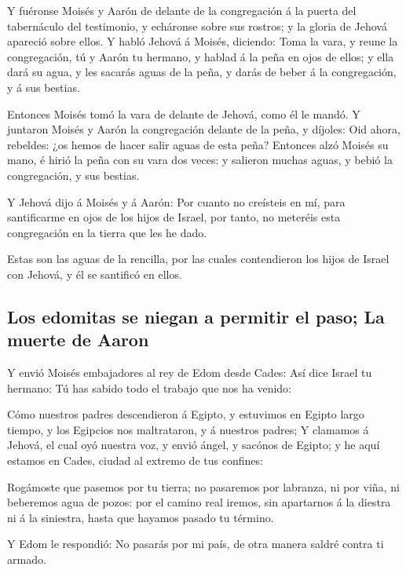  Y fuéronse Moisés y Aarón de delante de la congregación á
la puerta del tabernáculo del testimonio, y echáronse sobre sus rostros;
y la gloria de Jehová apareció sobre ellos.  Y habló Jehová
á Moisés, diciendo:  Toma la vara, y reune la congregación,
tú y Aarón tu hermano, y hablad á la peña en ojos de ellos; y ella dará
su agua, y les sacarás aguas de la peña, y darás de beber á la
congregación, y á sus bestias.

 Entonces Moisés tomó la vara de delante de Jehová, como él
le mandó.  Y juntaron Moisés y Aarón la congregación
delante de la peña, y díjoles: Oid ahora, rebeldes: ¿os hemos de hacer
salir aguas de esta peña?  Entonces alzó Moisés su mano, é
hirió la peña con su vara dos veces: y salieron muchas aguas, y bebió la
congregación, y sus bestias.

 Y Jehová dijo á Moisés y á Aarón: Por cuanto no creísteis
en mí, para santificarme en ojos de los hijos de Israel, por tanto, no
meteréis esta congregación en la tierra que les he dado.

 Estas son las aguas de la rencilla, por las cuales
contendieron los hijos de Israel con Jehová, y él se santificó en ellos.

\hypertarget{los-edomitas-se-niegan-a-permitir-el-paso-la-muerte-de-aaron}{%
\subsection{Los edomitas se niegan a permitir el paso; La muerte de
Aaron}\label{los-edomitas-se-niegan-a-permitir-el-paso-la-muerte-de-aaron}}

 Y envió Moisés embajadores al rey de Edom desde Cades: Así
dice Israel tu hermano: Tú has sabido todo el trabajo que nos ha venido:

 Cómo nuestros padres descendieron á Egipto, y estuvimos en
Egipto largo tiempo, y los Egipcios nos maltrataron, y á nuestros
padres;  Y clamamos á Jehová, el cual oyó nuestra voz, y
envió ángel, y sacónos de Egipto; y he aquí estamos en Cades, ciudad al
extremo de tus confines:

 Rogámoste que pasemos por tu tierra; no pasaremos por
labranza, ni por viña, ni beberemos agua de pozos: por el camino real
iremos, sin apartarnos á la diestra ni á la siniestra, hasta que hayamos
pasado tu término.

 Y Edom le respondió: No pasarás por mi país, de otra
manera saldré contra ti armado.

